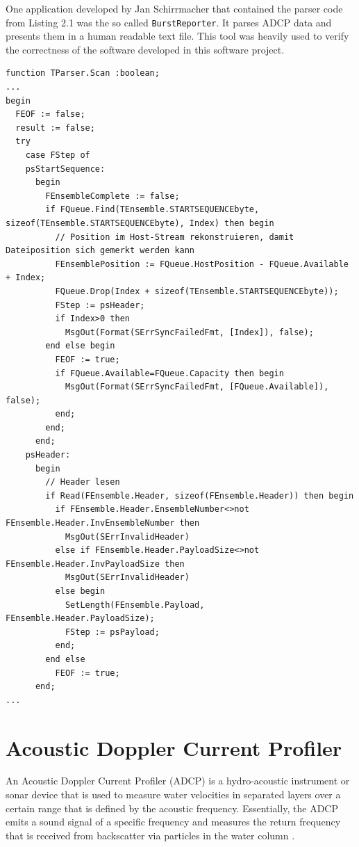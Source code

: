 One application developed by Jan Schirrmacher that contained the parser code from Listing 2.1 was the so called \texttt{BurstReporter}. It parses ADCP data and presents them in a human readable text file. This tool was heavily used to verify the correctness of the software developed in this software project.
\vspace{5em}
\begin{lstlisting}[language=Delphi, caption=Exemplary ADCP parser code from Jan Schirrmacher]
function TParser.Scan :boolean;
...
begin
  FEOF := false;
  result := false;
  try
    case FStep of
    psStartSequence:
      begin
        FEnsembleComplete := false;
        if FQueue.Find(TEnsemble.STARTSEQUENCEbyte, sizeof(TEnsemble.STARTSEQUENCEbyte), Index) then begin
          // Position im Host-Stream rekonstruieren, damit Dateiposition sich gemerkt werden kann
          FEnsemblePosition := FQueue.HostPosition - FQueue.Available + Index;
          FQueue.Drop(Index + sizeof(TEnsemble.STARTSEQUENCEbyte));
          FStep := psHeader;
          if Index>0 then
            MsgOut(Format(SErrSyncFailedFmt, [Index]), false);
        end else begin
          FEOF := true;
          if FQueue.Available=FQueue.Capacity then begin
            MsgOut(Format(SErrSyncFailedFmt, [FQueue.Available]), false);
          end;
        end;
      end;
    psHeader:
      begin
        // Header lesen
        if Read(FEnsemble.Header, sizeof(FEnsemble.Header)) then begin
          if FEnsemble.Header.EnsembleNumber<>not FEnsemble.Header.InvEnsembleNumber then
            MsgOut(SErrInvalidHeader)
          else if FEnsemble.Header.PayloadSize<>not FEnsemble.Header.InvPayloadSize then
            MsgOut(SErrInvalidHeader)
          else begin
            SetLength(FEnsemble.Payload, FEnsemble.Header.PayloadSize);
            FStep := psPayload;
          end;
        end else
          FEOF := true;
      end;
...
\end{lstlisting}
\vspace{4em}
\section{Acoustic Doppler Current Profiler}
An Acoustic Doppler Current Profiler (ADCP) is a hydro-acoustic instrument or sonar device that is used to measure water velocities in separated layers over a certain range that is defined by the acoustic frequency. Essentially, the ADCP emits a sound signal of a specific frequency and measures the return frequency that is received from backscatter via particles in the water column \cite{adcp_def}.

